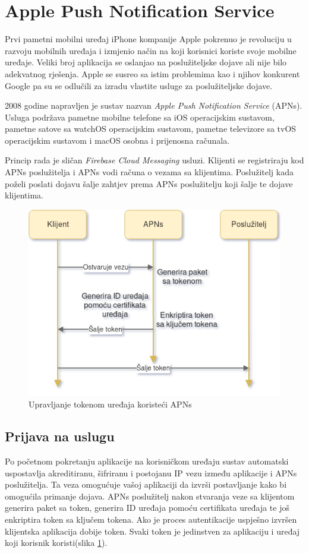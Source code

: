 \documentclass[times, utf8, zavrsni]{fer}
\begin{document}
{\section{Apple Push Notification Service}

Prvi pametni mobilni uređaj iPhone kompanije Apple pokrenuo je revoluciju u razvoju mobilnih uređaja i izmjenio način na koji korisnici koriste svoje mobilne uređaje. Veliki broj aplikacija se oslanjao na poslužiteljske dojave ali nije bilo adekvatnog rješenja. Apple se susreo sa istim problemima kao i njihov konkurent Google pa su se odlučili za izradu vlastite usluge za poslužiteljske dojave.

2008 godine napravljen je sustav nazvan {\em Apple Push Notification Service} (APNs). Usluga podržava pametne mobilne telefone sa iOS operacijskim sustavom, pametne satove sa watchOS operacijskim sustavom, pametne televizore sa tvOS operacijskim sustavom i macOS osobna i prijenosna računala.

Princip rada je sličan {\em Firebase Cloud Messaging} usluzi. Klijenti se registriraju kod APNs poslužitelja i APNs vodi računa o vezama sa klijentima. Poslužitelj kada poželi poslati dojavu šalje zahtjev prema APNs poslužitelju koji šalje te dojave klijentima.

\begin{figure}[htb]
\centering
\includegraphics[width=12cm]{img/apns.png}
\caption{Upravljanje tokenom uređaja koristeći APNs}
\label{fig:apns-image}
\end{figure}

\subsection{Prijava na uslugu}
Po početnom pokretanju aplikacije na korisničkom uređaju sustav automatski uspostavlja akreditiranu, šifriranu i postojanu IP vezu između aplikacije i APNs poslužitelja. Ta veza omogućuje vašoj aplikaciji da izvrši postavljanje kako bi omogućila primanje dojava. APNs poslužitelj nakon stvaranja veze sa klijentom generira paket sa token, generira ID uređaja pomoću certifikata uređaja te još enkriptira token sa ključem tokena. Ako je proces autentikacije uspješno izvršen klijentska aplikacija dobije token. Svaki token je jedinstven za aplikaciju i uređaj koji korisnik koristi(slika \ref{fig:apns-image}).

}
\end{document}
